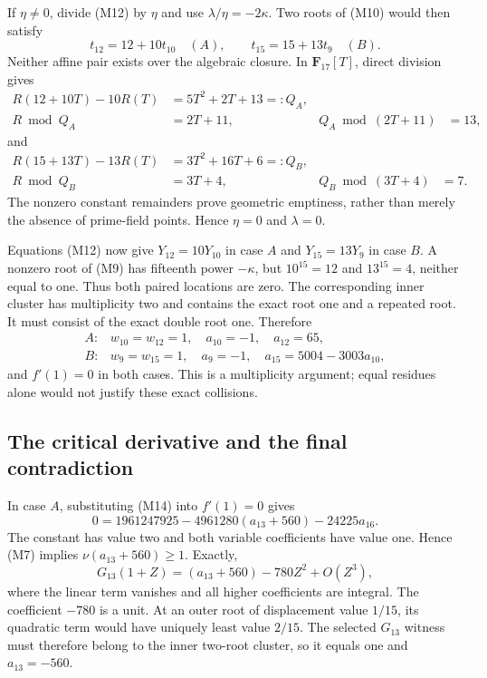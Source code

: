 \documentclass[
  british,
  10pt,
  a4paper,
]{article}
\begin{document}
If \(\eta\neq0\), divide (M12) by \(\eta\) and use
\(\lambda/\eta=-2\kappa\). Two roots of (M10) would then satisfy \[
t_{12}=12+10t_{10}\quad(A),\qquad
t_{15}=15+13t_9\quad(B).
\] Neither affine pair exists over the algebraic closure. In
\(\mathbf F_{17}[T]\), direct division gives \[
\begin{aligned}
R(12+10T)-10R(T)&=5T^2+2T+13=:Q_A,\\
R\bmod Q_A&=2T+11,& Q_A\bmod(2T+11)&=13,
\end{aligned}
\] and \[
\begin{aligned}
R(15+13T)-13R(T)&=3T^2+16T+6=:Q_B,\\
R\bmod Q_B&=3T+4,& Q_B\bmod(3T+4)&=7.
\end{aligned}                                                 \tag{M13}
\] The nonzero constant remainders prove geometric emptiness, rather
than merely the absence of prime-field points. Hence \(\eta=0\) and
\(\lambda=0\).

Equations (M12) now give \(Y_{12}=10Y_{10}\) in case \(A\) and
\(Y_{15}=13Y_9\) in case \(B\). A nonzero root of (M9) has fifteenth
power \(-\kappa\), but \(10^{15}=12\) and \(13^{15}=4\), neither equal
to one. Thus both paired locations are zero. The corresponding inner
cluster has multiplicity two and contains the exact root one and a
repeated root. It must consist of the exact double root one. Therefore
\[
\begin{array}{ll}
A:&w_{10}=w_{12}=1,\quad a_{10}=-1,\quad a_{12}=65,\\
B:&w_9=w_{15}=1,\quad a_9=-1,\quad a_{15}=5004-3003a_{10},
\end{array}                                                   \tag{M14}
\] and \(f'(1)=0\) in both cases. This is a multiplicity argument; equal
residues alone would not justify these exact collisions.

\subsection{The critical derivative and the final
contradiction}\label{the-critical-derivative-and-the-final-contradiction}

In case \(A\), substituting (M14) into \(f'(1)=0\) gives \[
0=1961247925-4961280(a_{13}+560)-24225a_{16}.                   \tag{M15}
\] The constant has value two and both variable coefficients have value
one. Hence (M7) implies \(\nu(a_{13}+560)\geq1\). Exactly, \[
G_{13}(1+Z)=(a_{13}+560)-780Z^2+O(Z^3),
\] where the linear term vanishes and all higher coefficients are
integral. The coefficient \(-780\) is a unit. At an outer root of
displacement value \(1/15\), its quadratic term would have uniquely
least value \(2/15\). The selected \(G_{13}\) witness must therefore
belong to the inner two-root cluster, so it equals one and
\(a_{13}=-560\).
\end{document}
